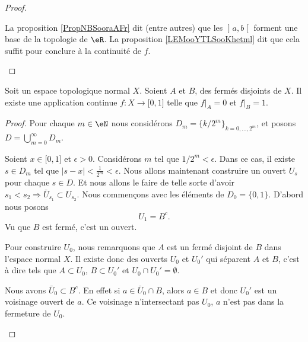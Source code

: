\begin{proof}
\begin{subproof}
			La proposition \ref{PropNBSooraAFr} dit (entre autres) que les \( \mathopen] a , b \mathclose[\) forment une base de la topologie de \( \eR\). La proposition \ref{LEMooYTLSooKhetml} dit que cela suffit pour conclure à la continuité de \( f\).
	\end{subproof}
\end{proof}


\begin{theorem}     \label{THOooKYYEooLFcNpg}
	Soit un espace topologique normal \( X\). Soient \( A\) et \( B\), des fermés disjoints de \( X\). Il existe une application continue \( f\colon X\to \mathopen[ 0 , 1 \mathclose]\) telle que \( f|_A=0\) et \( f|_B=1\).
\end{theorem}

\begin{proof}
	Pour chaque \( m\in \eN\) nous considérons \( D_m=\{ k/2^m \}_{k=0,\ldots, 2^m}\), et posons \( D=\bigcup_{m=0}^{\infty}D_m\).
	\begin{subproof}
		Soient \( x\in\mathopen[ 0 , 1 \mathclose]\) et \( \epsilon>0\). Considérons \( m\) tel que \( 1/2^m<\epsilon\). Dans ce cas, il existe \( s\in D_m\) tel que \( | s-x |<\frac{1}{ 2^m }<\epsilon\).
		Nous allons maintenant construire un ouvert \( U_s\) pour chaque \( s\in D\). Et nous allons le faire de telle sorte d'avoir \( s_1<s_2\Rightarrow \bar U_{s_1}\subset U_{s_2}\).
		\spitem[Pour \( s\in D_0\)]
		Nous commençons avec les éléments de \( D_0=\{ 0,1 \}\). D'abord nous posons
		\begin{equation}
			U_1=B^c.
		\end{equation}
		Vu que \( B\) est fermé, c'est un ouvert.

		Pour construire \( U_0\), nous remarquons que \( A\) est un fermé disjoint de \( B\) dans l'espace normal \( X\). Il existe donc des ouverts \( U_0\) et \( U_0'\) qui séparent \( A\) et \( B\), c'est à dire tels que \( A\subset U_0\), \( B\subset U_0'\) et \( U_0\cap U_0'=\emptyset\).

		Nous avons \( \bar U_0\subset B^c\). En effet si \( a\in \bar U_0\cap B\), alors \( a\in B\) et donc \( U_0'\) est un voisinage ouvert de \( a\). Ce voisinage n'intersectant pas \( U_0\), \( a\) n'est pas dans la fermeture de \( U_0\).


\end{subproof}
\end{proof}

